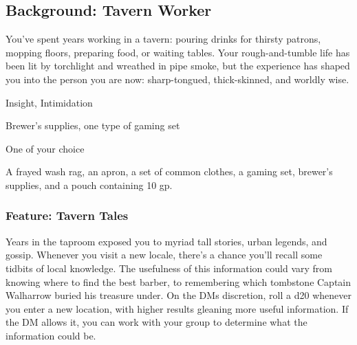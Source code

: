 \documentclass[10pt,a4paper,twoside,twocolumn,openany,bg=print,nodeprecatedcode]{dndbook}
\begin{document}
\subsection{Background: Tavern Worker}
You've spent years working in a tavern: pouring drinks for thirsty patrons, mopping floors, preparing food, or waiting tables. Your rough-and-tumble life has been lit by torchlight and wreathed in pipe smoke, but the experience has shaped you into the person you are now: sharp-tongued, thick-skinned, and worldly wise.

\begin{description}[nolistsep]
\item[Skill Proficiencies.]
Insight, Intimidation
\item[Tool Proficiencies.]
Brewer's supplies, one type of gaming set
\item[Languages.]
One of your choice
\item[Equipment.]
A frayed wash rag, an apron, a set of common clothes, a gaming set, brewer's supplies, and a pouch containing 10 gp.
\end{description}

\subsubsection{Feature: Tavern Tales}
Years in the taproom exposed you to myriad tall stories, urban legends, and gossip. Whenever you visit a new locale, there's a chance you'll recall some tidbits of local knowledge. The usefulness of this information could vary from knowing where to find the best barber, to remembering which tombstone Captain Walharrow buried his treasure under.
On the DMs discretion, roll a d20 whenever you enter a new location, with higher results gleaning more useful information. If the DM allows it, you can work with your group to determine what the information could be.
\end{document}
